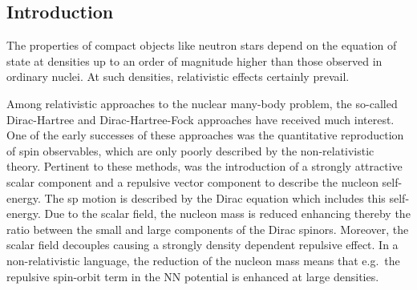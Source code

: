 
\subsection{Introduction}

The properties of compact
objects like neutron stars depend on the equation of state
at densities up to an order of magnitude higher than those observed
in ordinary nuclei. At such densities, relativistic effects
certainly prevail.

Among relativistic approaches to the nuclear
many-body problem, the so-called Dirac-Hartree and Dirac-Hartree-Fock
approaches have received much interest.
One of the early successes of these
approaches was the quantitative reproduction of spin observables,
which are only poorly described by the non-relativistic theory.
Pertinent to these methods,
was the introduction of a strongly attractive scalar component
and a repulsive vector component \cite{sw86}
to describe the nucleon self-energy.
The sp motion is described by the Dirac equation which includes
this self-energy. Due to the scalar field, the nucleon mass is reduced
enhancing thereby the ratio between the small and large
components of the Dirac spinors. Moreover, the scalar field decouples
causing a
strongly density dependent repulsive effect. In a non-relativistic
language, the reduction of the nucleon mass means that e.g.\
the repulsive spin-orbit term in the
NN potential is enhanced
at large densities.

